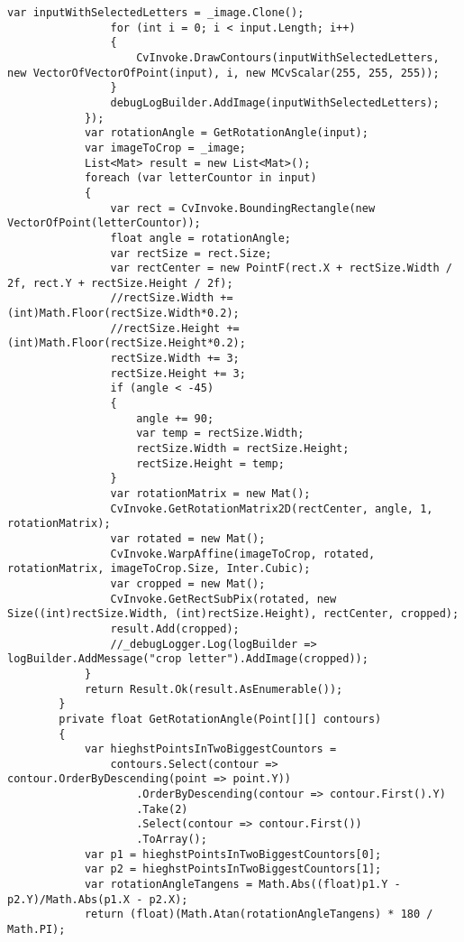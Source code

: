 \begin{lstlisting}[style=fsharpstyle,caption={Исходный код}, label=lst:recognition_result_handler]
                var inputWithSelectedLetters = _image.Clone();
                for (int i = 0; i < input.Length; i++)
                {
                    CvInvoke.DrawContours(inputWithSelectedLetters, new VectorOfVectorOfPoint(input), i, new MCvScalar(255, 255, 255));
                }
                debugLogBuilder.AddImage(inputWithSelectedLetters);
            });
            var rotationAngle = GetRotationAngle(input);
            var imageToCrop = _image;
            List<Mat> result = new List<Mat>();
            foreach (var letterCountor in input)
            {
                var rect = CvInvoke.BoundingRectangle(new VectorOfPoint(letterCountor));
                float angle = rotationAngle;
                var rectSize = rect.Size;
                var rectCenter = new PointF(rect.X + rectSize.Width / 2f, rect.Y + rectSize.Height / 2f);
                //rectSize.Width += (int)Math.Floor(rectSize.Width*0.2);
                //rectSize.Height += (int)Math.Floor(rectSize.Height*0.2);
                rectSize.Width += 3;
                rectSize.Height += 3;
                if (angle < -45)
                {
                    angle += 90;
                    var temp = rectSize.Width;
                    rectSize.Width = rectSize.Height;
                    rectSize.Height = temp;
                }
                var rotationMatrix = new Mat();
                CvInvoke.GetRotationMatrix2D(rectCenter, angle, 1, rotationMatrix);
                var rotated = new Mat();
                CvInvoke.WarpAffine(imageToCrop, rotated, rotationMatrix, imageToCrop.Size, Inter.Cubic);
                var cropped = new Mat();
                CvInvoke.GetRectSubPix(rotated, new Size((int)rectSize.Width, (int)rectSize.Height), rectCenter, cropped);
                result.Add(cropped);
                //_debugLogger.Log(logBuilder => logBuilder.AddMessage("crop letter").AddImage(cropped));
            }
            return Result.Ok(result.AsEnumerable());
        }
        private float GetRotationAngle(Point[][] contours)
        {
            var hieghstPointsInTwoBiggestCountors =
                contours.Select(contour => contour.OrderByDescending(point => point.Y))
                    .OrderByDescending(contour => contour.First().Y)
                    .Take(2)
                    .Select(contour => contour.First())
                    .ToArray();
            var p1 = hieghstPointsInTwoBiggestCountors[0];
            var p2 = hieghstPointsInTwoBiggestCountors[1];
            var rotationAngleTangens = Math.Abs((float)p1.Y - p2.Y)/Math.Abs(p1.X - p2.X);
            return (float)(Math.Atan(rotationAngleTangens) * 180 / Math.PI);

\end{lstlisting}
